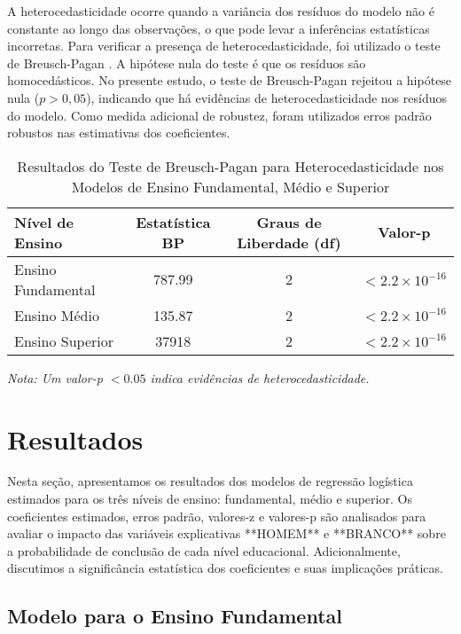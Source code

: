 \documentclass[a4paper,12pt]{article}
\begin{document}
A heterocedasticidade ocorre quando a variância dos resíduos do modelo não é constante ao longo das observações, o que pode levar a inferências estatísticas incorretas. Para verificar a presença de heterocedasticidade, foi utilizado o teste de Breusch-Pagan \cite{breusch1979}. A hipótese nula do teste é que os resíduos são homocedásticos. No presente estudo, o teste de Breusch-Pagan rejeitou a hipótese nula (\(p > 0,05\)), indicando que há evidências de heterocedasticidade nos resíduos do modelo. Como medida adicional de robustez, foram utilizados erros padrão robustos nas estimativas dos coeficientes.
\begin{table}[htbp]
    \centering
    \caption{Resultados do Teste de Breusch-Pagan para Heterocedasticidade nos Modelos de Ensino Fundamental, Médio e Superior}
    \label{tab:breusch_pagan}
    \begin{tabular}{lccc}
    \toprule
    \textbf{Nível de Ensino} & \textbf{Estatística BP} & \textbf{Graus de Liberdade (df)} & \textbf{Valor-p} \\
    \midrule
    Ensino Fundamental & 787.99 & 2 & \(< 2.2 \times 10^{-16}\) \\
    Ensino Médio       & 135.87 & 2 & \(< 2.2 \times 10^{-16}\) \\
    Ensino Superior    & 37918  & 2 & \(< 2.2 \times 10^{-16}\) \\
    \bottomrule
    \end{tabular}
    \smallskip
    \footnotesize{\textit{Nota: Um valor-p \(< 0.05\) indica evidências de heterocedasticidade.}}
\end{table}
\newpage

\section{Resultados}
Nesta seção, apresentamos os resultados dos modelos de regressão logística estimados para os três níveis de ensino: fundamental, médio e superior. Os coeficientes estimados, erros padrão, valores-z e valores-p são analisados para avaliar o impacto das variáveis explicativas **HOMEM** e **BRANCO** sobre a probabilidade de conclusão de cada nível educacional. Adicionalmente, discutimos a significância estatística dos coeficientes e suas implicações práticas.

\subsection{Modelo para o Ensino Fundamental}
\end{document}
